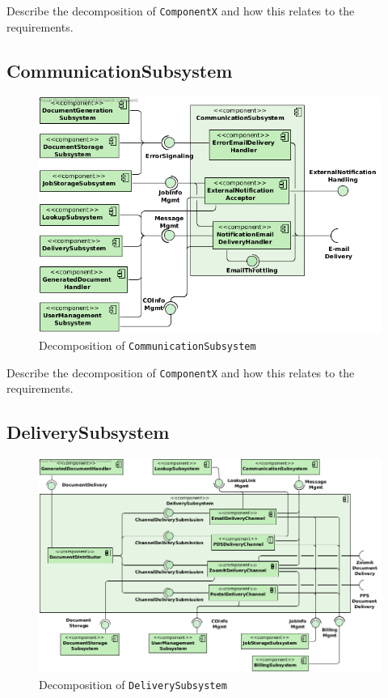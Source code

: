 Describe the decomposition of \texttt{ComponentX} and how this relates to the
requirements.

\subsection{CommunicationSubsystem}
\begin{figure}[!htp]
    \centering
    \includegraphics[width=\textwidth]{figures/Communication Subsystem.png}
    \caption{Decomposition of \texttt{CommunicationSubsystem}}\label{fig:decomp-commsub}
\end{figure}

Describe the decomposition of \texttt{ComponentX} and how this relates to the
requirements.

\subsection{DeliverySubsystem}
\begin{figure}[!htp]
    \centering
    \includegraphics[width=\textwidth]{figures/Delivery Subsystem.png}
    \caption{Decomposition of \texttt{DeliverySubsystem}}\label{fig:decomp-delisub}
\end{figure}

